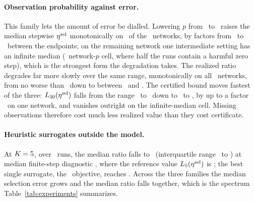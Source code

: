 \paragraph{Observation probability against error.}
This family lets the amount of error be dialled.  Lowering $p$ from
\ETwoPHigh\ to \ETwoPLow\ raises the median stepwise $\eta^{\mathrm{sel}}$ monotonically
on \ETwoNumGraphsEtaMonotone\ of the \ETwoNumGraphs\ networks, by factors
from \ETwoEtaRiseMin\ to \ETwoEtaRiseMax\ between the endpoints; on the
remaining network one intermediate setting has an infinite median
(\ETwoInfMedianCells\ network-$p$ cell, where half the runs contain a
harmful zero step), which is the strongest form the degradation takes.  The
realized ratio degrades far more slowly over the same range, monotonically
on all \ETwoNumGraphsRatioMonotone\ networks, from no worse than
\ETwoRatioPHighMin\ down to between \ETwoRatioPLowMin\ and
\ETwoRatioPLowMax.  The certified bound moves fastest of the three:
$L_{30}(\eta^{\mathrm{sel}})$ falls from the range \ETwoBoundPHighMin\ to
\ETwoBoundPHighMax\ down to \ETwoBoundPLowMin\ to \ETwoBoundPLowMax, by up
to a factor \ETwoBoundDropFactorMax\ on one network, and vanishes outright
on the infinite-median cell.  Missing observations therefore cost much less
realized value than they cost certificate.

\paragraph{Heuristic surrogates outside the model.}
At $K=5$, over \EThreeNumRunsKMain\ runs, the median ratio falls
to \EThreeKMainRatioMedian\ (interquartile range \EThreeKMainRatioLoQ\ to
\EThreeKMainRatioHiQ) at median finite-step diagnostic
\EThreeKMainEtaSelMedian, where the reference value
$L_{5}(\eta^{\mathrm{sel}})$ is \EThreeKMainBound; the best single
surrogate, the
\EThreeBestSurrogateName\ objective, reaches \EThreeBestSurrogateRatio.
Across the three families the median selection
error grows and the median ratio falls together, which is the spectrum
Table~\ref{tab:experiments} summarizes.

